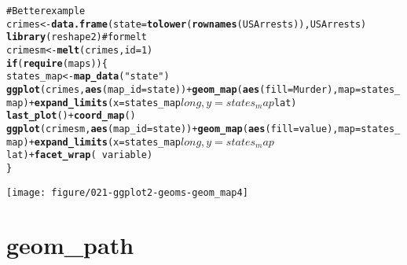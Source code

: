 \documentclass[a4paper,titlepage]{tufte-handout}\usepackage{graphicx, color}
\makeatletter
\def\maxwidth{ %
  \ifdim\Gin@nat@width>\linewidth
    \linewidth
  \else
    \Gin@nat@width
  \fi
}
\newcommand{\hlfunctioncall}[1]{\textcolor[rgb]{0.501960784313725,0,0.329411764705882}{\textbf{#1}}}%
\newcommand{\hlstring}[1]{\textcolor[rgb]{0.6,0.6,1}{#1}}%
\newcommand{\hlcomment}[1]{\textcolor[rgb]{0.180392156862745,0.6,0.341176470588235}{#1}}%
\newenvironment{kframe}{%
 \def\at@end@of@kframe{}%
 \ifinner\ifhmode%
  \def\at@end@of@kframe{\end{minipage}}%
  \begin{minipage}{\columnwidth}%
 \fi\fi%
 \def\FrameCommand##1{\hskip\@totalleftmargin \hskip-\fboxsep
 \colorbox{shadecolor}{##1}\hskip-\fboxsep
     \hskip-\linewidth \hskip-\@totalleftmargin \hskip\columnwidth}%
 \MakeFramed {\advance\hsize-\width
   \@totalleftmargin\z@ \linewidth\hsize
   \@setminipage}}%
 {\par\unskip\endMakeFramed%
 \at@end@of@kframe}
\newenvironment{knitrout}{}{} %
\makeatother
\begin{document}
\begin{knitrout}
\begin{kframe}
\begin{alltt}
\hlcomment{# Better example}
crimes <- \hlfunctioncall{data.frame}(state = \hlfunctioncall{tolower}(\hlfunctioncall{rownames}(USArrests)), USArrests)
\hlfunctioncall{library}(reshape2) \hlcomment{# for melt}
crimesm <- \hlfunctioncall{melt}(crimes, id = 1)
\hlfunctioncall{if} (\hlfunctioncall{require}(maps)) \{
  states_map <- \hlfunctioncall{map_data}(\hlstring{"state"})
  \hlfunctioncall{ggplot}(crimes, \hlfunctioncall{aes}(map_id = state)) + \hlfunctioncall{geom_map}(\hlfunctioncall{aes}(fill = Murder), map = states_map) + \hlfunctioncall{expand_limits}(x = states_map$long, y = states_map$lat)
  \hlfunctioncall{last_plot}() + \hlfunctioncall{coord_map}()
  \hlfunctioncall{ggplot}(crimesm, \hlfunctioncall{aes}(map_id = state)) + \hlfunctioncall{geom_map}(\hlfunctioncall{aes}(fill = value), map = states_map) + \hlfunctioncall{expand_limits}(x = states_map$long, y = states_map$lat) + \hlfunctioncall{facet_wrap}( ~ variable)
\}
\end{alltt}
\end{kframe}\texttt{[image: figure/021-ggplot2-geoms-geom\_map4]} 
\end{knitrout}


\section{geom\_path}
\end{document}
